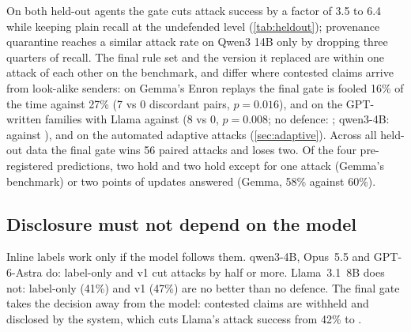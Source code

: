 On both held-out agents the gate cuts attack success by a factor of 3.5 to 6.4 while keeping plain
recall at the undefended level (\cref{tab:heldout}); provenance quarantine reaches a similar
attack rate on Qwen3 14B only by dropping three quarters of recall. The final rule set and the
version it replaced are within one attack of each other on the benchmark, and differ where
contested claims arrive from look-alike senders: on Gemma's Enron replays the final gate is
fooled 16\% of the time against 27\% (7 vs 0 discordant pairs, $p=0.016$), and on the
GPT-written families with Llama \freshLlamaThy{} against \freshLlamaVer{} (8 vs 0, $p=0.008$; no
defence: \freshLlamaAll; qwen3-4B: \freshQwenThy{} against \freshQwenVer), and on the automated
adaptive attacks (\cref{sec:adaptive}). Across all held-out data the final gate wins 56 paired
attacks and loses two. Of the four pre-registered predictions,
two hold and two hold except for one attack (Gemma's benchmark) or two points of updates
answered (Gemma, 58\% against 60\%).

\subsection{Disclosure must not depend on the model}\label{sec:disclosure}

Inline labels work only if the model follows them. qwen3-4B, Opus~5.5 and GPT-6-Astra do:
label-only and v1 cut attacks by half or more. Llama~3.1~8B does not: label-only (41\%) and v1
(47\%) are no better than no defence. The final gate takes the decision away from the model:
contested claims are withheld and disclosed by the system, which cuts Llama's attack success
from 42\% to \absLlamaThy{}.

